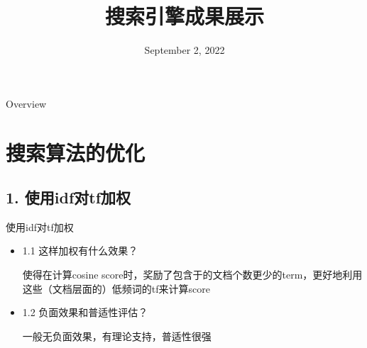 \documentclass[12pt]{beamer}
\title[10.47.101.170]{搜索引擎成果展示}
\author{}
\institute[人工智能综合实践2班]
{人工智能综合实践2班 \\ %
\medskip
\textit{sherman.hou@gmail.com} %

}
\date{September 2, 2022}
\begin{document}
\begin{frame}
\titlepage%
\end{frame}

\begin{frame}{Overview}
\tableofcontents
\end{frame}



\section{搜索算法的优化} %

\subsection{1. 使用idf对tf加权} %

\begin{frame}{使用idf对tf加权}
\begin{itemize}
\item 1.1 这样加权有什么效果？

使得在计算cosine score时，奖励了包含于的文档个数更少的term，更好地利用这些（文档层面的）低频词的tf来计算score
\item 1.2 负面效果和普适性评估？

一般无负面效果，有理论支持，普适性很强
\end{itemize}
\end{frame}
\end{document}
